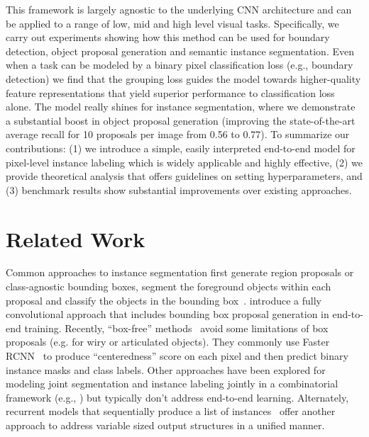 \documentclass[10pt,twocolumn,letterpaper]{article}
\begin{document}
This framework is largely agnostic to the underlying CNN architecture and can
be applied to a range of low, mid and high level visual tasks. Specifically,
we carry out experiments showing how this method can be used for boundary
detection, object proposal generation and semantic instance segmentation. Even
when a task can be modeled by a binary pixel classification loss (e.g.,
boundary detection) we find that the grouping loss guides the model towards
higher-quality feature representations that yield superior performance to
classification loss alone. The model really shines for instance segmentation,
where we demonstrate a substantial boost in object proposal generation
(improving the state-of-the-art average recall for 10 proposals per image from
0.56 to 0.77).  To summarize our contributions: (1) we introduce a simple,
easily interpreted end-to-end model for pixel-level instance labeling which is
widely applicable and highly effective, (2) we provide theoretical analysis
that offers guidelines on setting hyperparameters, and (3) benchmark results
show substantial improvements over existing approaches.

\section{Related Work}

Common approaches to instance segmentation first generate region proposals or
class-agnostic bounding boxes, segment the foreground objects within each
proposal and classify the objects in the bounding box~\cite{yang2012layered,
ladicky2010and, hariharan2014simultaneous, chen2015multi, dai2016instance,
liang2016reversible, he2017mask}.  \cite{li2016fully} introduce a fully
convolutional approach that includes bounding box proposal generation in
end-to-end training.  Recently, ``box-free''
methods~\cite{pinheiro2015learning, pinheiro2016learning, liang2015proposal,
hu2016fastmask} avoid some limitations of box proposals (e.g. for wiry or
articulated objects). They commonly use Faster RCNN~\cite{ren2015faster} to
produce ``centeredness'' score on each pixel and then predict binary instance
masks and class labels.  Other approaches have been explored for modeling joint
segmentation and instance labeling jointly in a combinatorial framework (e.g.,
\cite{kirillov2016instancecut}) but typically don't address end-to-end
learning.  Alternately, recurrent models that sequentially produce a list of
instances~\cite{romera2016recurrent,renend} offer another approach to address
variable sized output structures in a unified manner.
\end{document}
